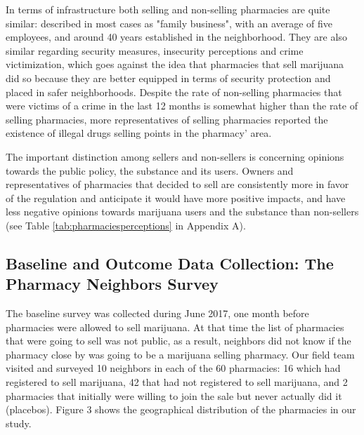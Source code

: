 \documentclass[11pt]{article}
\begin{document}
In terms of infrastructure both selling and non-selling pharmacies are quite similar:  described in most cases as "family business", with an average of five employees, and around 40 years established in the neighborhood. They are also similar regarding security measures, insecurity perceptions and crime victimization, which goes against the idea that pharmacies that sell marijuana did so because they are better equipped in terms of security protection and placed in safer neighborhoods. Despite the rate of non-selling pharmacies that were victims of a crime in the last 12 months is somewhat higher than the rate of selling pharmacies, more representatives of selling pharmacies reported the existence of illegal drugs selling points in the pharmacy' area. 

The important distinction among sellers and non-sellers is concerning opinions towards the public policy, the substance and its users. Owners and representatives of pharmacies that decided to sell are consistently more in favor of the regulation and anticipate it would have more positive impacts, and have less negative opinions towards marijuana users and the substance than non-sellers (see Table \ref{tab:pharmaciesperceptions} in Appendix A). 

\subsection{Baseline and Outcome Data Collection: The Pharmacy Neighbors Survey}

The baseline survey was collected during June 2017, one month before pharmacies were allowed to sell marijuana. At that time the list of pharmacies that were going to sell was not public, as a result, neighbors did not know if the pharmacy close by was going to be a marijuana selling pharmacy. Our field team visited and surveyed 10 neighbors in each of the 60 pharmacies: 16 which had registered to sell marijuana, 42 that had not registered to sell marijuana, and 2 pharmacies that initially were willing to join the sale but never actually did it (placebos). Figure 3 shows the geographical distribution of the pharmacies in our study.
\end{document}
